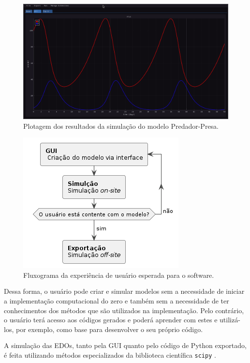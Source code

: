 \documentclass[
	12pt,				%
	openright,			%
	oneside,			%
	a4paper,			%
	main=brazil,
	english,			%
	]{ufsj-abntex2}
\begin{document}
\begin{figure}[h]
    \centering
    \includegraphics[width=\textwidth]{imgs/ode-designer/grafico-all.png} 
    \caption{Plotagem dos resultados da simulação do modelo Predador-Presa.}
    \label{fig:gui-grafico-all}
\end{figure}

\begin{figure}[h]
    \centering
    \includegraphics[scale=1]{diagrams/img/fluxograma-exp.png}
    \caption{Fluxograma da experiência de usuário esperada para o software.}
    \label{fig::experiencia_usuario}
\end{figure}

Dessa forma, o usuário pode criar e simular modelos sem a necessidade de iniciar a implementação computacional do zero e também sem a necessidade de ter conhecimentos dos métodos que são utilizados na implementação. Pelo contrário, o usuário terá acesso aos códigos gerados e poderá aprender com estes e utilizá-los, por exemplo, como base para desenvolver o seu próprio código. 

A simulação das EDOs, tanto pela GUI quanto pelo código de Python exportado, é feita utilizando métodos especializados da biblioteca científica \texttt{scipy} \cite{scipy}. %
\end{document}
